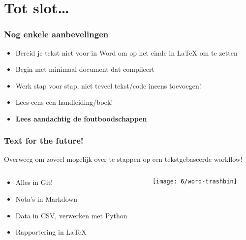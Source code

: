 \documentclass[aspectratio=169]{beamer}
\begin{document}
\section{Tot slot\ldots}

\begin{frame}
  \frametitle{Nog enkele aanbevelingen}

  \begin{itemize}
    \item Bereid je tekst niet voor in Word om op het einde in {\LaTeX} om te zetten
    \item Begin met minimaal document dat compileert
    \item Werk stap voor stap, niet teveel tekst/code ineens toevoegen!
    \item Lees eens een handleiding/boek!
    \item \textbf{Lees aandachtig de foutboodschappen}
  \end{itemize}

\end{frame}

\begin{frame}
  \frametitle{Text for the future!}

  Overweeg om zoveel mogelijk over te stappen op een tekstgebaseerde workflow!

  \begin{columns}
    \begin{column}{.7\textwidth}
      \begin{itemize}
        \item Alles in Git!
        \item Nota's in Markdown
        \item Data in CSV, verwerken met Python
        \item Rapportering in LaTeX
      \end{itemize}
    \end{column}

    \begin{column}{.3\textwidth}
      \texttt{[image: 6/word-trashbin]}
    \end{column}
  \end{columns}


\end{frame}
\end{document}
